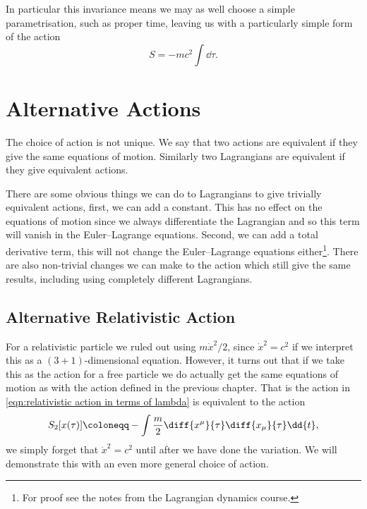 In particular this invariance means we may as well choose a simple parametrisation, such as proper time, leaving us with a particularly simple form of the action
\begin{equation}
    S = -mc^2 \int \dd{\tau}.
\end{equation}

\chapter{Alternative Actions}
The choice of action is not unique.
We say that two actions are equivalent if they give the same equations of motion.
Similarly two Lagrangians are equivalent if they give equivalent actions.

There are some obvious things we can do to Lagrangians to give trivially equivalent actions, first, we can add a constant.
This has no effect on the equations of motion since we always differentiate the Lagrangian and so this term will vanish in the Euler--Lagrange equations.
Second, we can add a total derivative term, this will not change the Euler--Lagrange equations either\footnote{For proof see the notes from the Lagrangian dynamics course.}.
There are also non-trivial changes we can make to the action which still give the same results, including using completely different Lagrangians.

\section{Alternative Relativistic Action}
For a relativistic particle we ruled out using \(m\dot{x}^2/2\), since \(\dot{x}^2 = c^2\) if we interpret this as a \((3 + 1)\)-dimensional equation.
However, it turns out that if we take this as the action for a free particle we do actually get the same equations of motion as with the action defined in the previous chapter.
That is the action in \cref{eqn:relativistic action in terms of lambda} is equivalent to the action
\begin{equation}
    S_2[x(\tau)] \coloneqq -\int \frac{m}{2}\diff{x^\mu}{\tau} \diff{x_\mu}{\tau} \dd{t},
\end{equation}
we simply forget that \(\dot{x}^2 = c^2\) until after we have done the variation.
We will demonstrate this with an even more general choice of action.


